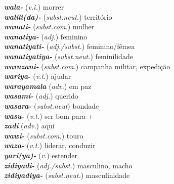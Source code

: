 \begin{multicols}{2}
\begin{hangparas}{1em}{1}
		\textbf{\emph{wala-}} (\emph{v.i.}) \tabto{1em} morrer\\
		\textbf{\emph{walili{(da)}-}} (\emph{subst.neut.}) \tabto{1em} território\\
		\textbf{\emph{wanati-}} (\emph{subst.com.}) \tabto{1em} mulher\\
		\textbf{\emph{wanatiya-}} (\emph{adj.}) \tabto{1em} feminino\\
		\textbf{\emph{wanatiyati-}} (\emph{adj./subst.}) \tabto{1em} feminino/fêmea\\
		\textbf{\emph{wanatiyatiya-}} (\emph{subst.neut.}) \tabto{1em} feminilidade\\
		\columnbreak%
		\textbf{\emph{warazani-}} (\emph{subst.com.}) \tabto{1em} campanha militar, expedição\\
		\textbf{\emph{wariya}-} (\emph{v.t.}) \tabto{1em} ajudar\\
		\textbf{\emph{warayamala}} (\emph{adv.}) \tabto{1em} em paz\\
		\textbf{\emph{wasami-}} (\emph{adj.}) \tabto{1em} querido\\
		\textbf{\emph{wasara-}} (\emph{subst.neut}) \tabto{1em} bondade\\
		\textbf{\emph{wasu-}} (\emph{v.t.}) \tabto{1em} ser bom para + \Dat{}\\
		\textbf{\emph{zadi}} (\emph{adv.}) \tabto{1em} aqui\\
		\textbf{\emph{wawi-}} (\emph{subst.com.}) \tabto{1em} touro\\
		\textbf{\emph{waza-}} (\emph{v.t.}) \tabto{1em}  liderar, conduzir\\
		\textbf{\emph{yari{(ya)}-}} (\emph{v.}) \tabto{1em} estender\\
		\textbf{\emph{zidiyadi-}} (\emph{adj./subst.}) \tabto{1em} masculino, macho\\
		\textbf{\emph{zidiyadiya-}} (\emph{subst.neut.}) \tabto{1em} masculinidade\\
	\end{hangparas}
\end{multicols}


